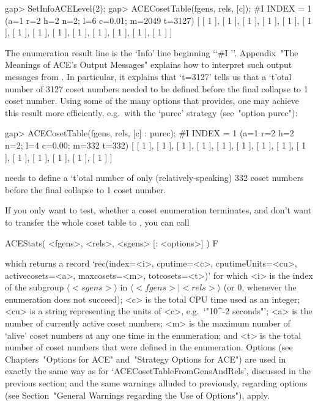 \beginexample
gap> SetInfoACELevel(2);
gap> ACECosetTable(fgens, rels, [c]);
#I  INDEX = 1 (a=1 r=2 h=2 n=2; l=6 c=0.01; m=2049 t=3127)
[ [ 1 ], [ 1 ], [ 1 ], [ 1 ], [ 1 ], [ 1 ], [ 1 ], [ 1 ], [ 1 ], [ 1 ], 
  [ 1 ], [ 1 ], [ 1 ], [ 1 ] ]
\endexample

The enumeration result line is the `Info' line beginning \lq{}`\#I ''.
Appendix~"The Meanings of  ACE's  Output  Messages"  explains  how  to
interpret such output messages from {\ACE}. In particular, it explains
that `t=3127' tells us that a `t'otal number  of  3127  coset  numbers
needed to be defined before the final  collapse  to  1  coset  number.
Using some of the many options that {\ACE} provides, one  may  achieve
this  result  more  efficiently,  e.g.~with   the   `purec'   strategy
(see~"option purec"):

\beginexample
gap> ACECosetTable(fgens, rels, [c] : purec);
#I  INDEX = 1 (a=1 r=2 h=2 n=2; l=4 c=0.00; m=332 t=332)
[ [ 1 ], [ 1 ], [ 1 ], [ 1 ], [ 1 ], [ 1 ], [ 1 ], [ 1 ], [ 1 ], [ 1 ], 
  [ 1 ], [ 1 ], [ 1 ], [ 1 ] ]
\endexample

{\ACE} needs to define a `t'otal number of only  (relatively-speaking)
332 coset numbers before the final collapse to 1 coset number.

\enditems


\beginitems

If you only want to  test, whether a coset enumeration terminates, and
don't want to  transfer the whole coset table  to {\GAP}, you can call

\>ACEStats( <fgens>, <rels>, <sgens> [: <options>] ) F

which returns a record `rec(index=<i>, cputime=<c>, cputimeUnits=<cu>,
activecosets=<a>, maxcosets=<m>, totcosets=<t>)' for which <i> is  the
index of the subgroup $\langle <sgens> \rangle$  in  $\langle  <fgens>
\mid <rels> \rangle$  (or  $0$,  whenever  the  enumeration  does  not
succeed); <c> is the total CPU time used as  an  integer;  <cu>  is  a
string representing the units of <c>, e.g.~`"10^-2 seconds"';  <a>  is
the number of currently active  coset  numbers;  <m>  is  the  maximum
number  of  \lq{}alive'  coset  numbers  at  any  one  time   in   the
enumeration; and <t> is the total number of coset  numbers  that  were
defined in the enumeration. Options (see  Chapters~"Options  for  ACE"
and~"Strategy Options for ACE") are used in exactly the  same  way  as
for `ACECosetTableFromGensAndRels', discussed in the previous section;
and the same warnings alluded to previously,  regarding  options  (see
Section~"General Warnings regarding the Use of Options"), apply.

